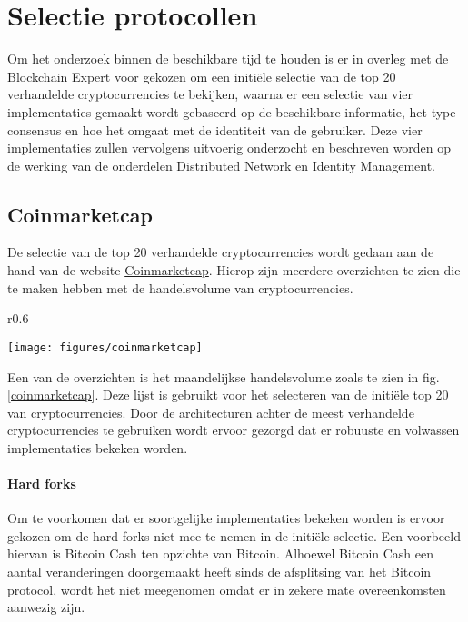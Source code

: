 \chapter{Selectie protocollen}
\label{selectie}

Om het onderzoek binnen de beschikbare tijd te houden is er in overleg met de Blockchain Expert voor gekozen om een initiële selectie van de top 20 verhandelde cryptocurrencies te bekijken, waarna er een selectie van vier implementaties gemaakt wordt gebaseerd op de beschikbare informatie, het type consensus en hoe het omgaat met de identiteit van de gebruiker. Deze vier implementaties zullen vervolgens uitvoerig onderzocht en beschreven worden op de werking van de onderdelen Distributed Network en Identity Management. 

\section{Coinmarketcap}

De selectie van de top 20 verhandelde cryptocurrencies wordt gedaan aan de hand van de website \href{https://coinmarketcap.com/}{Coinmarketcap}. Hierop zijn meerdere overzichten te zien die te maken hebben met de handelsvolume van cryptocurrencies.
\begin{wrapfigure}[17]{r}{0.6\textwidth}
  \begin{center}
    \texttt{[image: figures/coinmarketcap]}
    \caption[Snapshot Coinmarketcap] {
      Meest verhandelde cryptocurrencies in de maand februari zoals gepresenteerd op de website van Coinmarketcap.
    }
    \label{coinmarketcap}
  \end{center}
\end{wrapfigure}
Een van de overzichten is het maandelijkse handelsvolume zoals te zien in fig. \ref{coinmarketcap}. Deze lijst is gebruikt voor het selecteren van de initiële top 20 van cryptocurrencies. Door de architecturen achter de meest verhandelde cryptocurrencies te gebruiken wordt ervoor gezorgd dat er robuuste en volwassen implementaties bekeken worden.

\subsubsection{Hard forks}
Om te voorkomen dat er soortgelijke implementaties bekeken worden is ervoor gekozen om de hard forks niet mee te nemen in de initiële selectie. Een voorbeeld hiervan is Bitcoin Cash ten opzichte van Bitcoin. Alhoewel Bitcoin Cash een aantal veranderingen doorgemaakt heeft sinds de afsplitsing van het Bitcoin protocol, wordt het niet meegenomen omdat er in zekere mate overeenkomsten aanwezig zijn.

